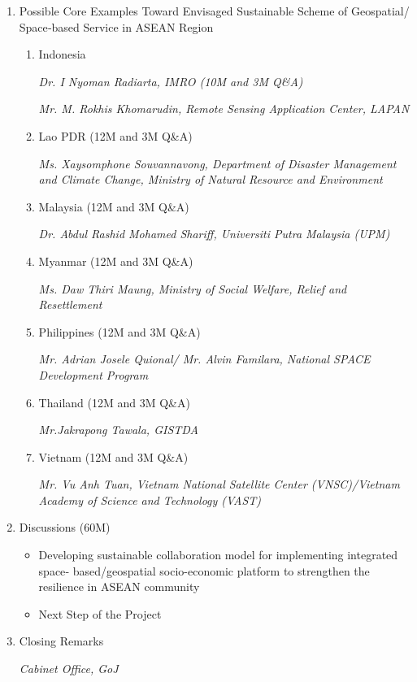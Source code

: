 {\begin{enumerate}
\begin{enumerate}
	\textit{Prof. Takayoshi Fukuyo, The University of Tokyo}
	
	\textit{Prof. Hiroyuki Miyazaki, The University of Tokyo}
	
	\textit{Mr. Quentin Verspieren, The University of Tokyo}
	\item Perspectives of ERIA and ADB's Strategies in Asian Cooperation (5M)
	
	\textit{Quentin Verspieren, The University of Tokyo}
	\end{enumerate}

\item Possible Core Examples Toward Envisaged Sustainable Scheme of Geospatial/ Space‐based Service in ASEAN Region

	\begin{enumerate}
	\item Indonesia
		
	\textit{Dr. I Nyoman Radiarta, IMRO (10M and 3M Q\&A)}
	
	\textit{Mr. M. Rokhis Khomarudin, Remote Sensing Application Center, LAPAN}
	\item Lao PDR (12M and 3M Q\&A)
		
	\textit{Ms. Xaysomphone Souvannavong, Department of Disaster Management and Climate Change, Ministry of Natural Resource and Environment}
	\item Malaysia (12M and 3M Q\&A)
		
	\textit{Dr. Abdul Rashid Mohamed Shariff, Universiti Putra Malaysia (UPM)}
	\item Myanmar (12M and 3M Q\&A)
		
	\textit{Ms. Daw Thiri Maung, Ministry of Social Welfare, Relief and Resettlement}
	\item Philippines (12M and 3M Q\&A)
		
	\textit{Mr. Adrian Josele Quional/ Mr. Alvin Familara, National SPACE Development Program}
	\item Thailand (12M and 3M Q\&A)
		
	\textit{Mr.Jakrapong Tawala, GISTDA}
	\item Vietnam (12M and 3M Q\&A)
		
	\textit{Mr. Vu Anh Tuan, Vietnam National Satellite Center (VNSC)/Vietnam Academy of Science and Technology (VAST)}
	\end{enumerate} 

\item Discussions (60M)
	
	\begin{itemize}
	\item Developing sustainable collaboration model for implementing integrated space‐ based/geospatial socio-economic platform to strengthen the resilience in ASEAN community
	\item Next Step of the Project
	\end{itemize} 

\item Closing Remarks
	
\textit{Cabinet Office, GoJ}

\end{enumerate}
}

